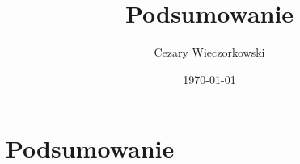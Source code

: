 \documentclass[../main.tex]{subfiles}
\author{Cezary Wieczorkowski}
\date{\today}
\title{Podsumowanie}
\begin{document}
\section{Podsumowanie}
\end{document}
